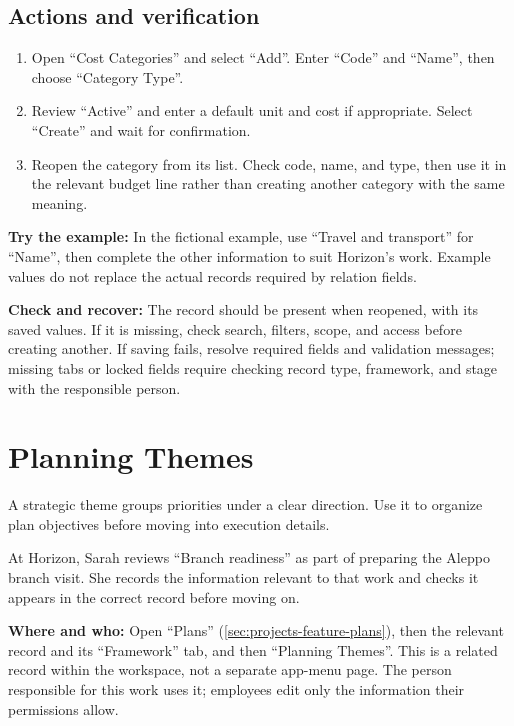 \subsection{Actions and verification}
\begin{enumerate}
\item Open “Cost Categories” and select “Add”. Enter “Code” and “Name”, then choose “Category Type”.
\item Review “Active” and enter a default unit and cost if appropriate. Select “Create” and wait for confirmation.
\item Reopen the category from its list. Check code, name, and type, then use it in the relevant budget line rather than creating another category with the same meaning.
\end{enumerate}

\textbf{Try the example:} In the fictional example, use “Travel and transport” for “Name”, then complete the other information to suit Horizon's work. Example values do not replace the actual records required by relation fields.

\textbf{Check and recover:} The record should be present when reopened, with its saved values. If it is missing, check search, filters, scope, and access before creating another. If saving fails, resolve required fields and validation messages; missing tabs or locked fields require checking record type, framework, and stage with the responsible person.

\clearpage
\section{Planning Themes}
\label{sec:projects-feature-planning-themes}

A strategic theme groups priorities under a clear direction. Use it to organize plan objectives before moving into execution details.

\begin{rcnote}
At Horizon, Sarah reviews “Branch readiness” as part of preparing the Aleppo branch visit. She records the information relevant to that work and checks it appears in the correct record before moving on.
\end{rcnote}

\textbf{Where and who:} Open “Plans” (\ref{sec:projects-feature-plans}), then the relevant record and its “Framework” tab, and then “Planning Themes”. This is a related record within the workspace, not a separate app-menu page. The person responsible for this work uses it; employees edit only the information their permissions allow.


